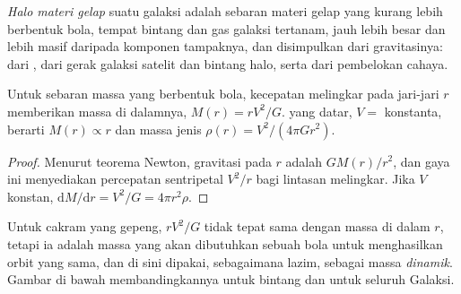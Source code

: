 \begin{definition}\label{def:b3:milky-way-galaxies:halo}
\emph{Halo materi gelap} suatu galaksi adalah
sebaran materi gelap yang kurang lebih berbentuk bola, tempat bintang dan gas
galaksi tertanam, jauh lebih besar dan lebih masif daripada komponen tampaknya,
dan disimpulkan dari gravitasinya: dari , dari gerak galaksi satelit
dan bintang halo, serta dari pembelokan cahaya.
\end{definition}

\begin{theorem}\label{thm:b3:milky-way-galaxies:enclosed}
Untuk sebaran massa yang berbentuk bola, kecepatan melingkar pada jari-jari $r$
memberikan massa di dalamnya, $M(r) = rV^2/G$.  yang datar,
$V = $ konstanta, berarti $M(r) \propto r$ dan massa jenis
$\rho(r) = V^2/(4\pi G r^2)$.
\end{theorem}

\begin{proof}
Menurut teorema Newton, gravitasi pada $r$ adalah $GM(r)/r^2$, dan gaya ini
menyediakan percepatan sentripetal $V^2/r$ bagi lintasan melingkar. Jika $V$ konstan,
$\mathrm{d}M/\mathrm{d}r = V^2/G = 4\pi r^2\rho$.
\end{proof}

Untuk cakram yang gepeng, $rV^2/G$ tidak tepat sama dengan massa di dalam $r$, tetapi
ia adalah massa yang akan dibutuhkan sebuah bola untuk menghasilkan orbit yang sama, dan
di sini dipakai, sebagaimana lazim, sebagai massa \emph{dinamik}. Gambar di bawah
membandingkannya untuk bintang dan untuk seluruh Galaksi.


